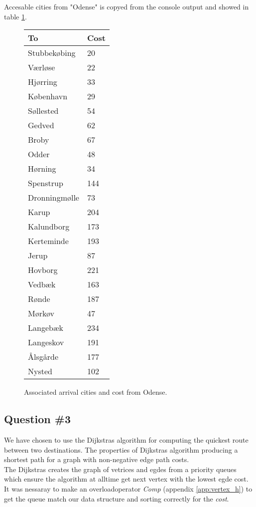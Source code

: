 Accesable cities from "Odense" is copyed from the console output and showed in table \ref{tb:fromodense}. 
\begin{figure}[th!]
\centering
\begin{tabular}{l|l}
To &Cost\\\hline
Stubbekøbing & 20\\
Værløse & 22\\
Hjørring & 33\\
København & 29\\
Søllested & 54\\
Gedved & 62\\
Broby & 67\\
Odder & 48\\
Hørning & 34\\
Spenstrup & 144\\
Dronningmølle & 73\\
Karup & 204\\
Kalundborg & 173\\
Kerteminde & 193\\
Jerup & 87\\
Hovborg & 221\\
Vedbæk & 163\\
Rønde & 187\\
Mørkøv & 47\\
Langebæk & 234\\
Langeskov & 191\\
Ålsgårde & 177\\
Nysted & 102\\
\end{tabular}
\captionsetup{type=table}
\caption[tekst i indholdsfortegnelsen]{Associated arrival cities and cost from Odense.}
\label{tb:fromodense}
\end{figure}

\subsection{Question \#3}
We have chosen to use the Dijkstras algorithm for computing the quickest route between two destinations. The properties of Dijkstras algorithm producing a shortest path for a graph with non-negative edge path costs. \\
The Dijkstras creates the graph of vetrices and egdes from a priority queues which ensure the algorithm at alltime  get next vertex with the lowest egde cost. It was nessaray to make an overloadoperator \emph{Comp} (appendix \ref{app:vertex_h}) to get the queue match our data structure and sorting correctly for the \emph{cost}.\\

